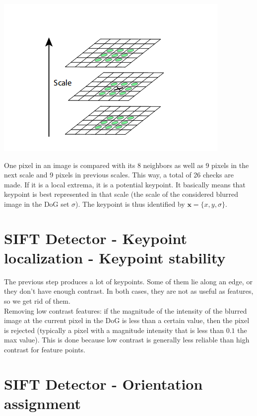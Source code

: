 \documentclass{article}
\begin{document}
\begin{center}
    \includegraphics[width=.6\linewidth]{images/sift_keypoint_localization.png}
\end{center}

One pixel in an image is compared with its 8 neighbors as well as 9 pixels in the next scale and 9 pixels in previous scales. This way, a total of 26 checks are made. If it is a local extrema, it is a potential keypoint. It basically means that keypoint is best represented in that scale (the scale of the considered blurred image in the DoG set $\sigma$). The keypoint is thus identified by $\textbf{x} = \{x, y, \sigma\}$.

\section*{SIFT Detector - Keypoint localization - Keypoint stability}

The previous step produces a lot of keypoints. Some of them lie along an edge, or they don’t have enough contrast. In both cases, they are not as useful as features, so we get rid of them. \\

Removing low contrast features: if the magnitude of the intensity of the blurred image at the current pixel in the DoG is less than a certain value, then the pixel is rejected (typically a pixel with a magnitude intensity that is less than $0.1$ the max value). This is done because low contrast is generally less reliable than high contrast for feature points. 

\newpage

\section*{SIFT Detector - Orientation assignment}
\end{document}
